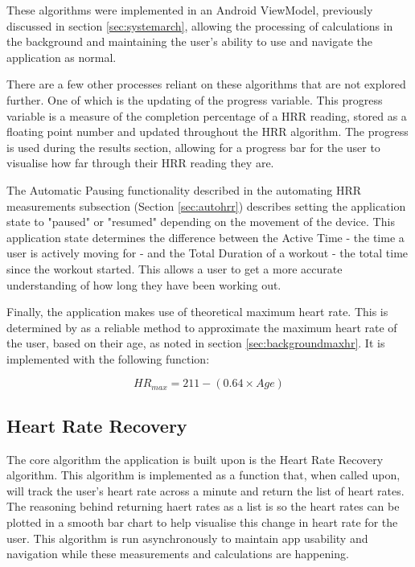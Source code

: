 \documentclass{l4proj}
\begin{document}
These algorithms were implemented in an Android ViewModel, previously discussed in section \ref{sec:systemarch}, allowing the processing of calculations in the background and maintaining the user's ability to use and navigate the application as normal.

There are a few other processes reliant on these algorithms that are not explored further. One of which is the updating of the progress variable. This progress variable is a measure of the completion percentage of a HRR reading, stored as a floating point number and updated throughout the HRR algorithm. The progress is used during the results section, allowing for a progress bar for the user to visualise how far through their HRR reading they are.

The Automatic Pausing functionality described in the automating HRR measurements subsection (Section \ref{sec:autohrr}) describes setting the application state to "paused" or "resumed" depending on the movement of the device. This application state determines the difference between the Active Time - the time a user is actively moving for - and the Total Duration of a workout - the total time since the workout started. This allows a user to get a more accurate understanding of how long they have been working out.

Finally, the application makes use of theoretical maximum heart rate. This is determined by \cite{NesHRmax} as a reliable method to approximate the maximum heart rate of the user, based on their age, as noted in section \ref{sec:backgroundmaxhr}. It is implemented with the following function:

$$
HR_{max} = 211 - (0.64 \times Age)
$$

\subsection{Heart Rate Recovery}
\label{sec:hrrimplementation}

The core algorithm the application is built upon is the Heart Rate Recovery algorithm. This algorithm is implemented as a function that, when called upon, will track the user’s heart rate across a minute and return the list of heart rates. The reasoning behind returning haert rates as a list is so the heart rates can be plotted in a smooth bar chart to help visualise this change in heart rate for the user. This algorithm is run asynchronously to maintain app usability and navigation while these measurements and calculations are happening. 
\end{document}
